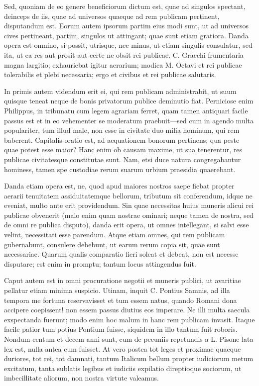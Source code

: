  Sed, quoniam de eo genere beneficiorum dictum est, quae ad singulos spectant, deinceps de iis, quae ad universos quaeque ad rem publicam pertinent, disputandum est. Eorum autem ipsorum partim eius modi sunt, ut ad universos cives pertineant, partim, singulos ut attingant; quae sunt etiam gratiora. Danda opera est omnino, si possit, utrisque, nec minus, ut etiam singulis consulatur, sed ita, ut ea res aut prosit aut certe ne obsit rei publicae. C. Gracchi frumentaria magna largitio; exhauriebat igitur aerarium; modica M. Octavi et rei publicae tolerabilis et plebi necessaria; ergo et civibus et rei publicae salutaris.

 In primis autem videndum erit ei, qui rem publicam administrabit, ut suum quisque teneat neque de bonis privatorum publice deminutio fiat. Perniciose enim Philippus, in tribunatu cum legem agrariam ferret, quam tamen antiquari facile passus est et in eo vehementer se moderatum praebuit—sed cum in agendo multa populariter, tum illud male, non esse in civitate duo milia hominum, qui rem baberent. Capitalis oratio est, ad aequationem bonorum pertinens; qua peste quae potest esse maior? Hanc enim ob causam maxime, ut sua tenerentur, res publicae civitatesque constitutae sunt. Nam, etsi duce natura congregabantur hominess, tamen spe custodiae rerum suarum urbium praesidia quaerebant.

 Danda etiam opera est, ne, quod apud maiores nostros saepe fiebat propter aerarii tenuitatem assiduitatemque bellorum, tributum sit conferendum, idque ne eveniat, multo ante erit providendum. Sin quae necessitas huius muneris alicui rei publicae obvenerit (malo enim quam nostrae ominari; neque tamen de nostra, sed de omni re publica disputo), danda erit opera, ut omnes intellegant, si salvi esse velint, necessitati esse parendum. Atque etiam omnes, qui rem publicam gubernabunt, consulere debebunt, ut earum rerum copia sit, quae sunt necessariae. Quarum qualis comparatio fieri soleat et debeat, non est necesse disputare; est enim in promptu; tantum locus attingendus fuit.

 Caput autem est in omni procuratione negotii et muneris publici, ut avaritiae pellatur etiam minima suspicio. Utinam, inquit C. Pontius Samnis, ad illa tempora me fortuna reservavisset et tum essem natus, quando Romani dona accipere coepissent! non essem passus diutius eos imperare. Ne illi multa saecula exspectanda fuerunt; modo enim hoc malum in hanc rem publicam invasit. Itaque facile patior tum potius Pontium fuisse, siquidem in illo tantum fuit roboris. Nondum centum et decem anni sunt, cum de pecuniis repetundis a L. Pisone lata lex est, nulla antea cum fuisset. At vero postea tot leges et proximae quaeque duriores, tot rei, tot damnati, tantum Italicum bellum propter iudiciorum metum excitatum, tanta sublatis legibus et iudiciis expilatio direptioque sociorum, ut imbecillitate aliorum, non nostra virtute valeamus.

